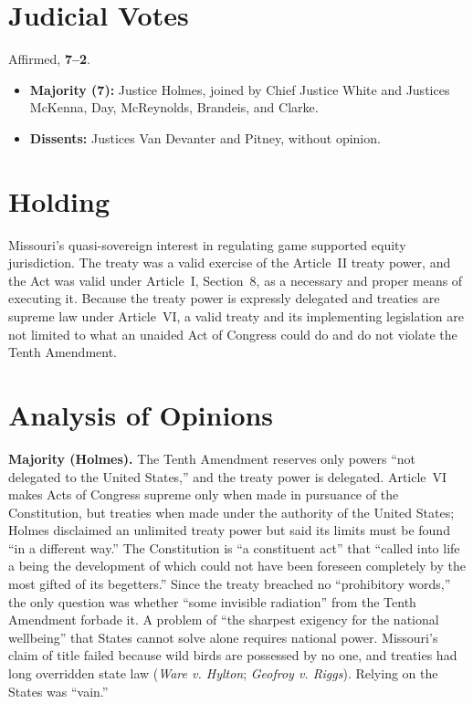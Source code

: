 \documentclass[12pt]{article}
\begin{document}
\section{Judicial Votes}

Affirmed, \textbf{7--2}.
\begin{itemize}
\item \textbf{Majority (7):} Justice Holmes, joined by Chief Justice White and Justices McKenna, Day, McReynolds, Brandeis, and Clarke.
\item \textbf{Dissents:} Justices Van Devanter and Pitney, without opinion.
\end{itemize}

\section{Holding}

Missouri's quasi-sovereign interest in regulating game supported equity jurisdiction. The treaty was a valid exercise of the Article~II treaty power, and the Act was valid under Article~I, Section~8, as a necessary and proper means of executing it. Because the treaty power is expressly delegated and treaties are supreme law under Article~VI, a valid treaty and its implementing legislation are not limited to what an unaided Act of Congress could do and do not violate the Tenth Amendment.

\section{Analysis of Opinions}

\textbf{Majority (Holmes).} The Tenth Amendment reserves only powers ``not delegated to the United States,'' and the treaty power is delegated. Article~VI makes Acts of Congress supreme only when made in pursuance of the Constitution, but treaties when made under the authority of the United States; Holmes disclaimed an unlimited treaty power but said its limits must be found ``in a different way.'' The Constitution is ``a constituent act'' that ``called into life a being the development of which could not have been foreseen completely by the most gifted of its begetters.'' Since the treaty breached no ``prohibitory words,'' the only question was whether ``some invisible radiation'' from the Tenth Amendment forbade it. A problem of ``the sharpest exigency for the national wellbeing'' that States cannot solve alone requires national power. Missouri's claim of title failed because wild birds are possessed by no one, and treaties had long overridden state law (\textit{Ware v. Hylton}; \textit{Geofroy v. Riggs}). Relying on the States was ``vain.''
\end{document}
